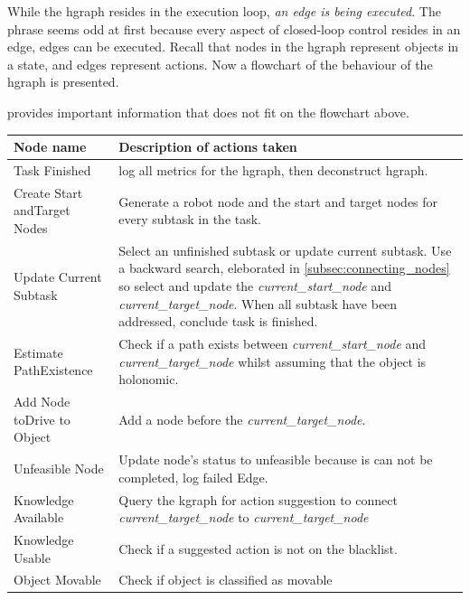 While the \ac{hgraph} resides in the execution loop, \textit{an edge is being executed}. The phrase  seems odd at first because every aspect of closed-loop control resides in an edge, edges can be executed. Recall that nodes in the \ac{hgraph} represent objects in a state, and edges represent actions. Now a flowchart of the behaviour of the \ac{hgraph} is presented.\bs



 provides important information that does not fit on the flowchart above.


\begin{table}[H]
\centering
{}
\begin{tabular}[t]{>{\raggedright}p{3.5cm}>{\raggedright\arraybackslash}p{10.5cm}}
  \textbf{Node name} & \textbf{Description of actions taken}\\\toprule
  Task Finished & log all metrics for the \ac{hgraph}, then deconstruct \ac{hgraph}.\\
  Create Start and\newline Target Nodes & Generate a robot node and the start and target nodes for every subtask in the task.\\
Update Current Subtask & Select an unfinished subtask or update current subtask. Use a backward search, eleborated in \cref{subsec:connecting_nodes} so select and update the \textit{current\_start\_node} and \textit{current\_target\_node}. When all subtask have been addressed, conclude task is finished. \\
Estimate Path\newline Existence & Check if a path exists between \textit{current\_start\_node} and \textit{current\_target\_node} whilst assuming that the object is holonomic.\\
Add Node to\newline Drive to Object & Add a node before the \textit{current\_target\_node}.\\
Unfeasible Node & Update node's status to unfeasible because is can not be completed, log failed Edge.\\
Knowledge Available& Query the \ac{kgraph} for action suggestion to connect \textit{current\_target\_node} to \textit{current\_target\_node}\\
Knowledge Usable& Check if a suggested action is not on the blacklist.\\
Object Movable & Check if object is classified as movable\\

\end{tabular}
\end{table}
